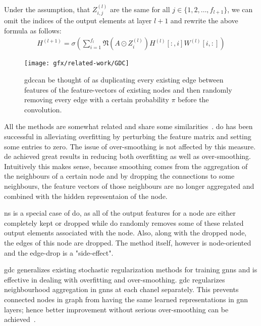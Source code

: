 Under the assumption, that $Z_{i,j}^{(l)}$ are the same for all $j \in \{1,2,\dots, f_{l+1}\}$,
we can omit the indices of the output elements at layer $l+1$ and rewrite the above formula as follows:
\begin{align*}
    H^{(l+1)} = \sigma(\sum_{i= 1}^{f_{l}}\mathfrak{N}(A \odot Z_{i}^{(l)})H^{(l)}[:,i] W^{(l)}[i,:])
\end{align*}
\begin{figure}[H]
    \centering
    \texttt{[image: gfx/related-work/GDC]}
    \caption{\acf{gdc}can be thought of as duplicating every existing edge between features of the feature-vectors of existing nodes and then randomly removing every edge with a certain probability $\pi$ before the convolution.}\label{fig:related:GraphDropConnect}
\end{figure}

All the methods are somewhat related and share some similarities~\cite{Rong2020}. \acf{do} has been successful in alleviating overfitting by perturbing the feature matrix and setting some entries to zero. The issue of over-smoothing is not affected by this measure.
\acf{de} achieved great results in reducing both overfitting as well as over-smoothing. Intuitively this makes sense, because smoothing comes from the aggregation of the neighbours of a certain node and by dropping the connections to some neighbours, the feature vectors of those neighbours are no longer aggregated and combined with the hidden representaion of the node.

\acf{ns} is a special case of \acf{do}, as all of the output features for a node are either completely kept or dropped while \ac{do} randomly removes some of these related output elements associated with the node. Also, along with the dropped node, the edges of this node are dropped. The method itself, however is node-oriented and the edge-drop is a "side-effect".

\acf{gdc} generalizes existing stochastic regularization methods for training \acp{gnn} and is effective in dealing with overfitting and over-smoothing.
\ac{gdc} regularizes neighbourhood aggregation in \acp{gnn} at each chanel separately. This prevents connected nodes in graph from having the same learned representations in \ac{gnn} layers; hence better improvement without serious over-smoothing can be achieved~\cite{Hasanzadeh2020}.



